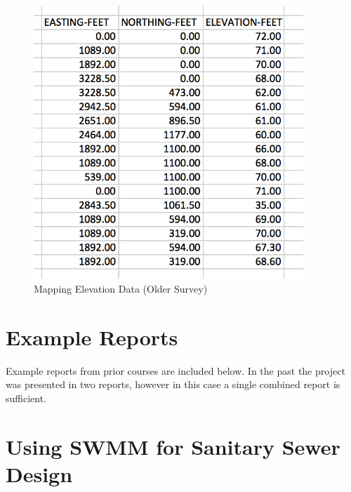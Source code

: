 \documentclass[12pt]{article}
\begin{document}
\begin{figure}[h!] %
   \centering
   \includegraphics[width=4in]{MapElevationData.jpg} 
   \caption{Mapping Elevation Data (Older Survey)}
   \label{fig:MapElevationData}
\end{figure}

\section{\small{Example Reports}}
Example reports from prior courses are included below.  In the past the project was presented in two reports, however in this case a single combined report is sufficient.



\section{\small{Using SWMM for Sanitary Sewer Design}}

\end{document}
